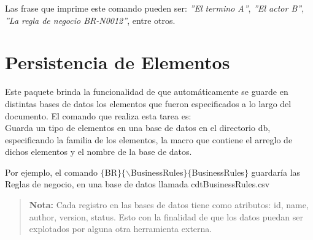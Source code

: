 \noindent Las frase que imprime este comando pueden ser: {\it''El termino A''}, {\it''El actor B''}, {\it''La regla de negocio BR-N0012''}, entre otros.

\section{Persistencia de Elementos}

    Este paquete brinda la funcionalidad de que automáticamente se guarde en distintas bases de datos los elementos que fueron especificados a lo largo del documento. El comando que realiza esta tarea es:\\

 Guarda un tipo de elementos en una base de datos en el directorio db, especificando la familia de los elementos, la macro que contiene el arreglo de dichos elementos y el nombre de la base de datos.

    \begin{code}
    \end{code}
    

\noindent Por ejemplo, el comando \colorbox{gray!10}{$\{$BR$\}\{\backslash$BusinessRules$\}\{$BusinessRules$\}$} guardaría las Reglas de negocio, en una base de datos llamada cdtBusinessRules.csv\\

    \begin{quote}    
    {\bf Nota:} Cada registro en las bases de datos tiene como atributos: id, name, author, version, status. Esto con la finalidad de que los datos puedan ser explotados por alguna otra herramienta externa.
    \end{quote}





